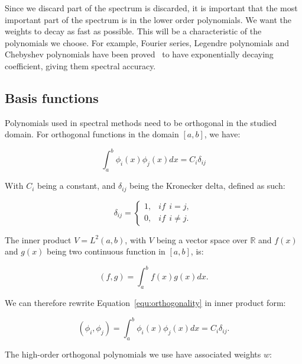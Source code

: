 Since we discard part of the spectrum is discarded, it is important that the most important part of
the spectrum is in the lower order polynomials. We want the weights to decay as fast as possible.
This will be a characteristic of the polynomials we choose. For example, Fourier series, Legendre
polynomials and Chebyshev polynomials have been proved~\cite{Kopriva2009} to have exponentially
decaying coefficient, giving them spectral accuracy.

\subsection{Basis functions} \label{section:spectral_element_method:spectral_approximation:basis_functions}
Polynomials used in spectral methods need to be orthogonal in the studied domain. For orthogonal
functions in the domain $[a, b]$, we have:

\begin{equation} \label{equ:orthogonality}
	\int_{a}^{b}\phi_i(x) \phi_j(x)dx = C_i \delta_{ij}
\end{equation}

With $C_i$ being a constant, and $\delta_{ij}$ being the Kronecker delta, defined as such:

\begin{equation} \label{equ:kronecker}
	\delta _{ij} = \left\{ \begin{matrix}
                    1, & if \:\: i = j,\\ 
                    0, & if \:\: i \neq j.
                    \end{matrix} \right.
\end{equation}

The inner product $V = L^2 \left( a, b \right)$, with $V$ being a vector space over $\mathbb{R}$ and
$f \left( x \right)$ and $g \left( x \right)$ being two continuous function in $\left[ a, b
\right]$, is:

\begin{equation}
    \left( f, g \right) = \int_{a}^{b}f(x)g(x)dx. 
\end{equation}

We can therefore rewrite Equation~\ref{equ:orthogonality} in inner product form:

\begin{equation}
	\left( \phi_i, \phi_j \right) = \int_{a}^{b}\phi_i(x) \phi_j(x)dx = C_i \delta_{ij}.
\end{equation}

The high-order orthogonal polynomials we use have associated weights $w$:

